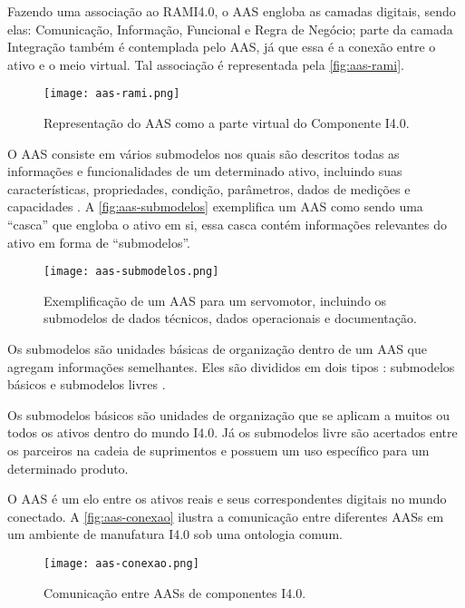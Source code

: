 	Fazendo uma associação ao RAMI4.0, o AAS engloba as camadas digitais, sendo elas: Comunicação, Informação, Funcional e Regra de Negócio; parte da camada Integração também é contemplada pelo AAS, já que essa é a conexão entre o ativo e o meio virtual. Tal associação é representada pela \autoref{fig:aas-rami}.

	\begin{figure}[htb]
		\centering
		\caption{Representação do AAS como a parte virtual do Componente I4.0.}
		\label{fig:aas-rami}
		\texttt{[image: aas-rami.png]}
	\end{figure}
		
	O AAS consiste em vários submodelos nos quais são descritos todas as informações e funcionalidades de um determinado ativo, incluindo suas características, propriedades, condição, parâmetros, dados de medições e capacidades \cite{bader2019aas}. A \autoref{fig:aas-submodelos} exemplifica um AAS como sendo uma ``casca'' que engloba o ativo em si, essa casca contém informações relevantes do ativo em forma de ``submodelos''.
	
	\begin{figure}[htb]
		\centering
		\caption{Exemplificação de um AAS para um servomotor, incluindo os submodelos de dados técnicos, dados operacionais e documentação.}
		\label{fig:aas-submodelos}
		\texttt{[image: aas-submodelos.png]}
	\end{figure}

	Os submodelos são unidades básicas de organização dentro de um AAS que agregam informações semelhantes. Eles são divididos em dois tipos \cite{plattform2019detailsaas}: submodelos básicos e submodelos livres \cite{bader2019aas}.
	
	Os submodelos básicos são unidades de organização que se aplicam a muitos ou todos os ativos dentro do mundo I4.0. Já os submodelos livre são acertados entre os parceiros na cadeia de suprimentos e possuem um uso específico para um determinado produto.
	
	O AAS é um elo entre os ativos reais e seus correspondentes digitais no mundo conectado. A \autoref{fig:aas-conexao} ilustra a comunicação entre diferentes AASs em um ambiente de manufatura I4.0 sob uma ontologia comum.
	
	\begin{figure}[htb]
		\centering
		\caption{Comunicação entre AASs de componentes I4.0.}
		\label{fig:aas-conexao}
		\texttt{[image: aas-conexao.png]}
	\end{figure}

